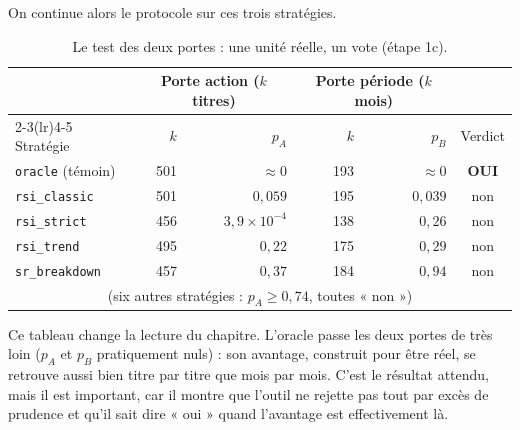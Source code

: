 On continue alors le protocole sur ces trois stratégies.

\begin{table}[H]
\centering
\caption{Le test des deux portes : une unité réelle, un vote (étape 1c).}
\label{tab:b1-dep-portes}
\small
\begin{tabular}{@{}lrrrrc@{}}
\toprule
 & \multicolumn{2}{c}{Porte action ($k$ titres)} & \multicolumn{2}{c}{Porte période ($k$ mois)} & \\
\cmidrule(lr){2-3}\cmidrule(lr){4-5}
Stratégie & $k$ & $p_A$ & $k$ & $p_B$ & Verdict \\
\midrule
\texttt{oracle} (témoin) & 501 & $\approx 0$          & 193 & $\approx 0$ & \textbf{OUI} \\
\midrule
\texttt{rsi\_classic}  & 501 & $0{,}059$            & 195 & $0{,}039$ & non \\
\texttt{rsi\_strict}   & 456 & $3{,}9\times10^{-4}$ & 138 & $0{,}26$  & non \\
\texttt{rsi\_trend}    & 495 & $0{,}22$             & 175 & $0{,}29$  & non \\
\texttt{sr\_breakdown} & 457 & $0{,}37$             & 184 & $0{,}94$  & non \\
\multicolumn{6}{c}{\footnotesize (six autres stratégies : $p_A \ge 0{,}74$, toutes « non »)} \\
\bottomrule
\end{tabular}
\end{table}
Ce tableau change la lecture du chapitre. L'oracle passe les deux
portes de très loin ($p_A$ et $p_B$ pratiquement nuls) : son avantage,
construit pour être réel, se retrouve aussi bien titre par titre que mois par
mois. C'est le résultat attendu, mais il est important, car il montre que
l'outil ne rejette pas tout par excès de prudence et qu'il sait dire
« oui » quand l'avantage est effectivement là.

